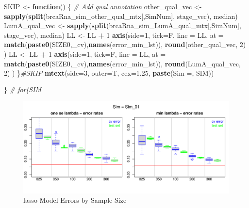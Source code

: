 \documentclass[
]{book}
\newenvironment{Shaded}{\begin{snugshade}}{\end{snugshade}}
\newcommand{\CommentTok}[1]{\textcolor[rgb]{0.56,0.35,0.01}{\textit{#1}}}
\newcommand{\ControlFlowTok}[1]{\textcolor[rgb]{0.13,0.29,0.53}{\textbf{#1}}}
\newcommand{\DataTypeTok}[1]{\textcolor[rgb]{0.13,0.29,0.53}{#1}}
\newcommand{\DecValTok}[1]{\textcolor[rgb]{0.00,0.00,0.81}{#1}}
\newcommand{\FloatTok}[1]{\textcolor[rgb]{0.00,0.00,0.81}{#1}}
\newcommand{\KeywordTok}[1]{\textcolor[rgb]{0.13,0.29,0.53}{\textbf{#1}}}
\newcommand{\NormalTok}[1]{#1}
\newcommand{\OperatorTok}[1]{\textcolor[rgb]{0.81,0.36,0.00}{\textbf{#1}}}
\newcommand{\StringTok}[1]{\textcolor[rgb]{0.31,0.60,0.02}{#1}}
\begin{document}
\begin{Shaded}
\begin{Highlighting}[]
\NormalTok{SKIP  <{-}}\StringTok{ }\ControlFlowTok{function}\NormalTok{() \{}
\CommentTok{\# Add qual annotation}
\NormalTok{other\_qual\_vec <{-}}\StringTok{ }\KeywordTok{sapply}\NormalTok{(}\KeywordTok{split}\NormalTok{(brcaRna\_sim\_other\_qual\_mtx[,SimNum], stage\_vec), median)}
\NormalTok{LumA\_qual\_vec <{-}}\StringTok{ }\KeywordTok{sapply}\NormalTok{(}\KeywordTok{split}\NormalTok{(brcaRna\_sim\_LumA\_qual\_mtx[,SimNum], stage\_vec), median)}
\NormalTok{LL <{-}}\StringTok{ }\NormalTok{LL }\OperatorTok{+}\StringTok{ }\DecValTok{1}
\KeywordTok{axis}\NormalTok{(}\DataTypeTok{side=}\DecValTok{1}\NormalTok{, }\DataTypeTok{tick=}\NormalTok{F, }\DataTypeTok{line =}\NormalTok{ LL,}
  \DataTypeTok{at =} \KeywordTok{match}\NormalTok{(}\KeywordTok{paste0}\NormalTok{(SIZE0,}\StringTok{\textquotesingle{}\_cv\textquotesingle{}}\NormalTok{),}\KeywordTok{names}\NormalTok{(error\_min\_lst)),}
  \KeywordTok{round}\NormalTok{(other\_qual\_vec, }\DecValTok{2}\NormalTok{)}
\NormalTok{ )}
\NormalTok{LL <{-}}\StringTok{ }\NormalTok{LL }\OperatorTok{+}\StringTok{ }\DecValTok{1}
\KeywordTok{axis}\NormalTok{(}\DataTypeTok{side=}\DecValTok{1}\NormalTok{, }\DataTypeTok{tick=}\NormalTok{F, }\DataTypeTok{line =}\NormalTok{ LL,}
  \DataTypeTok{at =} \KeywordTok{match}\NormalTok{(}\KeywordTok{paste0}\NormalTok{(SIZE0,}\StringTok{\textquotesingle{}\_cv\textquotesingle{}}\NormalTok{),}\KeywordTok{names}\NormalTok{(error\_min\_lst)),}
  \KeywordTok{round}\NormalTok{(LumA\_qual\_vec, }\DecValTok{2}\NormalTok{)}
\NormalTok{ )}
\NormalTok{\}}\CommentTok{\#SKIP}
\KeywordTok{mtext}\NormalTok{(}\DataTypeTok{side=}\DecValTok{3}\NormalTok{, }\DataTypeTok{outer=}\NormalTok{T, }\DataTypeTok{cex=}\FloatTok{1.25}\NormalTok{, }\KeywordTok{paste}\NormalTok{(}\StringTok{\textquotesingle{}Sim =\textquotesingle{}}\NormalTok{,  SIM))}

\NormalTok{\} }\CommentTok{\# for(SIM}
\end{Highlighting}
\end{Shaded}

\begin{figure}
\centering
\includegraphics{Static/figures/brca-rnaseq-lasso-simRes-errors-bySim-1.pdf}
\caption{\label{fig:brca-rnaseq-lasso-simRes-errors-bySim}lasso Model Errors by Sample Size}
\end{figure}
\end{document}
